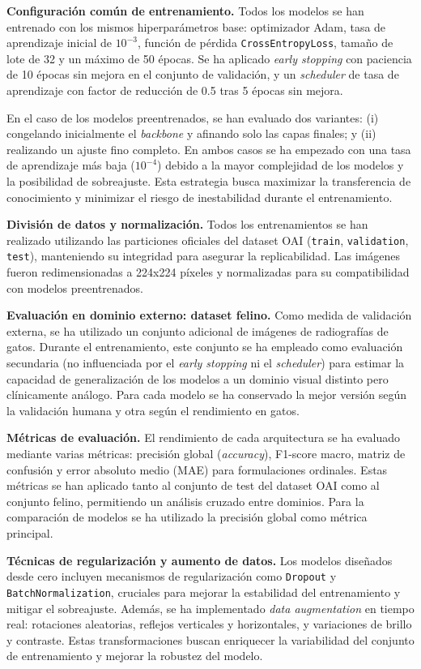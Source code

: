 \documentclass[11pt,spanish,listoffigures,listoftables]{tfgetsinf}
\begin{document}
\textbf{Configuración común de entrenamiento.}
Todos los modelos se han entrenado con los mismos hiperparámetros base: optimizador Adam, tasa de aprendizaje inicial de $10^{-3}$, función de pérdida
\texttt{CrossEntropyLoss}, tamaño de lote de 32 y un máximo de 50 épocas. Se ha aplicado \textit{early stopping} con paciencia de 10 épocas sin mejora 
en el conjunto de validación, y un \textit{scheduler} de tasa de aprendizaje con factor de reducción de 0.5 tras 5 épocas sin mejora.

En el caso de los modelos preentrenados, se han evaluado dos variantes: (i) congelando inicialmente el \textit{backbone} y afinando solo las capas finales; 
y (ii) realizando un ajuste fino completo. En ambos casos se ha empezado con una tasa de aprendizaje más baja ($10^{-4}$) debido a la mayor complejidad de
los modelos y la posibilidad de sobreajuste. Esta estrategia busca maximizar la transferencia de conocimiento y minimizar el riesgo de inestabilidad durante el
entrenamiento.

\textbf{División de datos y normalización.}
Todos los entrenamientos se han realizado utilizando las particiones oficiales del dataset OAI (\texttt{train}, \texttt{validation}, \texttt{test}), 
manteniendo su integridad para asegurar la replicabilidad. Las imágenes fueron redimensionadas a 224x224 píxeles y normalizadas para su compatibilidad 
con modelos preentrenados.

\textbf{Evaluación en dominio externo: dataset felino.}
Como medida de validación externa, se ha utilizado un conjunto adicional de imágenes de radiografías de gatos. Durante el entrenamiento, este conjunto 
se ha empleado como evaluación secundaria (no influenciada por el \textit{early stopping} ni el \textit{scheduler}) para estimar la capacidad de generalización 
de los modelos a un dominio visual distinto pero clínicamente análogo. Para cada modelo se ha conservado la mejor versión según la validación humana 
y otra según el rendimiento en gatos.

\textbf{Métricas de evaluación.}
El rendimiento de cada arquitectura se ha evaluado mediante varias métricas: precisión global (\textit{accuracy}), F1-score macro, matriz de confusión 
y error absoluto medio (MAE) para formulaciones ordinales. Estas métricas se han aplicado tanto al conjunto de test del dataset OAI como al conjunto 
felino, permitiendo un análisis cruzado entre dominios. Para la comparación de modelos se ha utilizado la precisión global como métrica principal.

\textbf{Técnicas de regularización y aumento de datos.}
Los modelos diseñados desde cero incluyen mecanismos de regularización como \texttt{Dropout} y \texttt{BatchNormalization}, cruciales para mejorar la 
estabilidad del entrenamiento y mitigar el sobreajuste. Además, se ha implementado \textit{data augmentation} en tiempo real: rotaciones aleatorias, 
reflejos verticales y horizontales, y variaciones de brillo y contraste. Estas transformaciones buscan enriquecer la variabilidad del conjunto de entrenamiento 
y mejorar la robustez del modelo.
\end{document}
